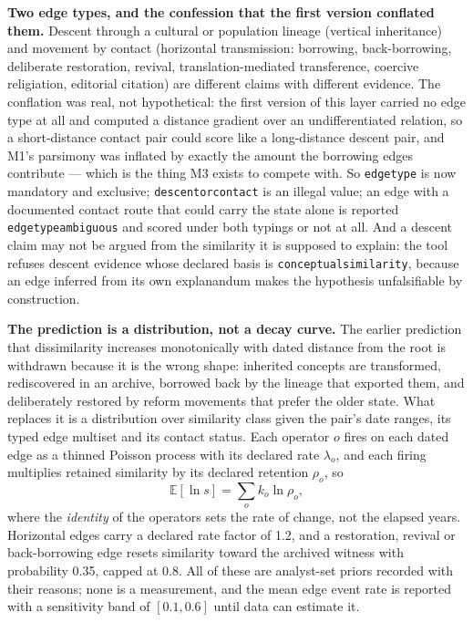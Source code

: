 \documentclass[11pt]{article}
\DeclareRobustCommand{\_}{\textunderscore\allowbreak}
\newcommand{\field}[1]{\texttt{\small #1}}
\begin{document}
\textbf{Two edge types, and the confession that the first version conflated
them.} Descent through a cultural or population lineage (vertical inheritance) and
movement by contact (horizontal transmission: borrowing, back-borrowing,
deliberate restoration, revival, translation-mediated transference, coercive
religiation, editorial citation) are different claims with different evidence. The
conflation was real, not hypothetical: the first version of this layer carried no
edge type at all and computed a distance gradient over an undifferentiated
relation, so a short-distance contact pair could score like a long-distance
descent pair, and M1's parsimony was inflated by exactly the amount the borrowing
edges contribute --- which is the thing M3 exists to compete with. So
\field{edge\_type} is now mandatory and exclusive; \texttt{descent\_or\_contact}
is an illegal value; an edge with a documented contact route that could carry the
state alone is reported \field{edge\_type\_ambiguous} and scored under both
typings or not at all. And a descent claim may not be argued from the similarity
it is supposed to explain: the tool refuses descent evidence whose declared basis
is \texttt{conceptual\_similarity}, because an edge inferred from its own
explanandum makes the hypothesis unfalsifiable by construction.

\textbf{The prediction is a distribution, not a decay curve.} The earlier
prediction that dissimilarity increases monotonically with dated distance from the
root is withdrawn because it is the wrong shape: inherited concepts are
transformed, rediscovered in an archive, borrowed back by the lineage that
exported them, and deliberately restored by reform movements that prefer the older
state. What replaces it is a distribution over similarity class given the pair's
date ranges, its typed edge multiset and its contact status. Each operator \(o\)
fires on each dated edge as a thinned Poisson process with its declared rate
\(\lambda_o\), and each firing multiplies retained similarity by its declared
retention \(\rho_o\), so
\begin{equation}
  \mathbb{E}[\ln s] = \sum_o k_o \ln \rho_o ,
\end{equation}
where the \emph{identity} of the operators sets the rate of change, not the
elapsed years. Horizontal edges carry a declared rate factor of 1.2, and a
restoration, revival or back-borrowing edge resets similarity toward the archived
witness with probability 0.35, capped at 0.8. All of these are analyst-set priors
recorded with their reasons; none is a measurement, and the mean edge event rate
is reported with a sensitivity band of \([0.1, 0.6]\) until data can estimate it.
\end{document}
